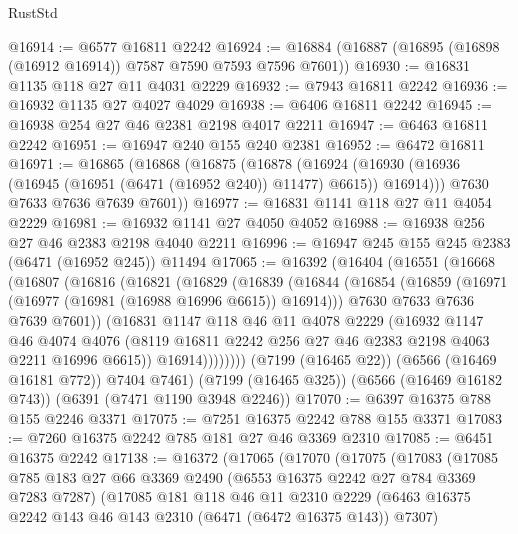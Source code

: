 \begin{lexlean}{RustStd}
\begin{coremodule}
{\begin{coremodule}
{{{{{{{{{{{{{{{{{{{{{{{{{{@16914 := @6577 @16811 @2242
@16924 := @16884 (@16887 (@16895 (@16898 (@16912 @16914)) @7587 @7590 @7593 @7596 @7601))
@16930 := @16831 @1135 @118 @27 @11 @4031 @2229
@16932 := @7943 @16811 @2242
@16936 := @16932 @1135 @27 @4027 @4029
@16938 := @6406 @16811 @2242
@16945 := @16938 @254 @27 @46 @2381 @2198 @4017 @2211
@16947 := @6463 @16811 @2242
@16951 := @16947 @240 @155 @240 @2381
@16952 := @6472 @16811
@16971 := @16865
    (@16868
      (@16875
        (@16878
          (@16924 (@16930 (@16936 (@16945 (@16951 (@6471 (@16952 @240)) @11477) @6615)) @16914)))
        @7630
        @7633
        @7636
        @7639
        @7601))
@16977 := @16831 @1141 @118 @27 @11 @4054 @2229
@16981 := @16932 @1141 @27 @4050 @4052
@16988 := @16938 @256 @27 @46 @2383 @2198 @4040 @2211
@16996 := @16947 @245 @155 @245 @2383 (@6471 (@16952 @245)) @11494
@17065 := @16392
    (@16404
      (@16551
        (@16668
          (@16807
            (@16816
              (@16821
                (@16829
                  (@16839
                    (@16844
                      (@16854
                        (@16859 (@16971 (@16977 (@16981 (@16988 @16996 @6615)) @16914)))
                        @7630
                        @7633
                        @7636
                        @7639
                        @7601))
                    (@16831
                      @1147
                      @118
                      @46
                      @11
                      @4078
                      @2229
                      (@16932
                        @1147
                        @46
                        @4074
                        @4076
                        (@8119 @16811 @2242 @256 @27 @46 @2383 @2198 @4063 @2211 @16996 @6615))
                      @16914))))))))
      (@7199 (@16465 @22))
      (@6566 (@16469 @16181 @772))
      @7404
      @7461)
    (@7199 (@16465 @325))
    (@6566 (@16469 @16182 @743))
    (@6391 (@7471 @1190 @3948 @2246))
@17070 := @6397 @16375 @788 @155 @2246 @3371
@17075 := @7251 @16375 @2242 @788 @155 @3371
@17083 := @7260 @16375 @2242 @785 @181 @27 @46 @3369 @2310
@17085 := @6451 @16375 @2242
@17138 := @16372
    (@17065
      (@17070
        (@17075
          (@17083
            (@17085
              @785
              @183
              @27
              @66
              @3369
              @2490
              (@6553 @16375 @2242 @27 @784 @3369 @7283 @7287)
              (@17085
                @181
                @118
                @46
                @11
                @2310
                @2229
                (@6463 @16375 @2242 @143 @46 @143 @2310 (@6471 (@6472 @16375 @143)) @7307)
}}}}}}}}}}}}}}}}}}}}}}}}}}
\end{coremodule}}
\end{coremodule}
\end{lexlean}
